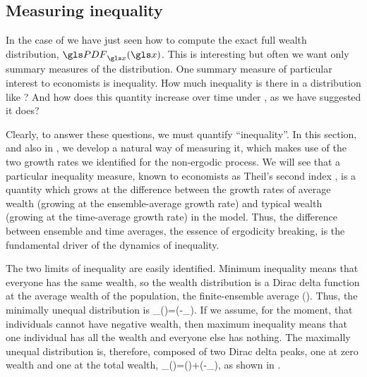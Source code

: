 
\subsection{Measuring inequality}
In the case of \GBM we have just seen how to 
compute the exact full wealth distribution, $\PDF_\x(\x)$. This is interesting but often we want only summary measures of the distribution. One summary measure of particular interest to economists is inequality. How much inequality is there in a distribution like ? And how does this quantity increase over time under \GBM, as we have suggested it does?

Clearly, to answer these questions, we must quantify ``inequality''. In this section, and also in \cite{AdamouPeters2016}, we develop a natural way of measuring it, which makes use of the two growth rates we identified for the non-ergodic process. We will see that a particular inequality measure, known to economists as Theil's second index \cite{Theil1967}, is a quantity which grows at the difference between the growth rates of average wealth (growing at the ensemble-average growth rate) and typical wealth (growing at the time-average growth rate) in the \GBM model. Thus, the difference between ensemble and time averages, the essence of ergodicity breaking, is the fundamental driver of the dynamics of inequality.

The two limits of inequality are easily identified. Minimum inequality means that everyone 
has the same wealth, so the wealth distribution is a Dirac delta function at the average wealth of the population, \ie the finite-ensemble average (\FEA). Thus, the minimally unequal distribution is
\be
\PDF_\x(\x)=\delta(\x-\ave{\x}_\N).
\ee
If we assume, for the moment, that individuals cannot have negative wealth, then maximum inequality means that one individual has all the wealth and everyone else has nothing.
The maximally unequal distribution is, therefore, composed of two Dirac delta peaks, one at zero wealth and one at the total wealth,
\be 
\PDF_\x(\x)=\delta()+\delta(\x-\N\ave{\x}_\N),
\ee
as shown in .

